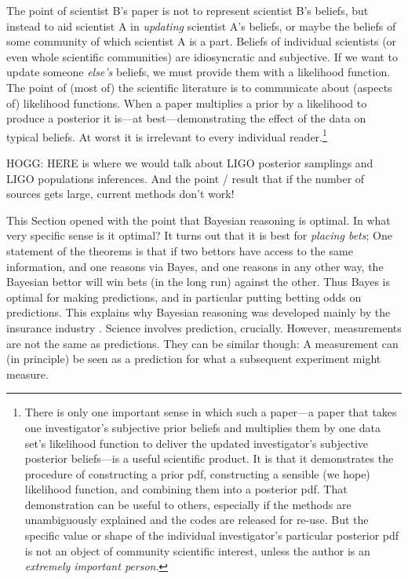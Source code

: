 \documentclass{article}
\newcommand{\sectionname}{Section}
\begin{document}
The point of scientist B's paper is not to represent scientist B's beliefs, but instead to aid scientist A in \emph{updating} scientist A's beliefs, or maybe the beliefs of some community of which scientist A is a part.
Beliefs of individual scientists (or even whole scientific communities) are idiosyncratic and subjective.
If we want to update someone \emph{else's} beliefs, we must provide them with a likelihood function.
The point of (most of) the scientific literature is to communicate about (aspects of) likelihood functions.
When a paper multiplies a prior by a likelihood to produce a posterior it is---at best---demonstrating the effect of the data on typical beliefs.
At worst it is irrelevant to every individual reader.\footnote{%
There is only one important sense in which such a paper---a paper that takes one investigator's subjective prior beliefs and multiplies them by one data set's likelihood function to deliver the updated investigator's subjective posterior beliefs---is a useful scientific product.
It is that it demonstrates the procedure of constructing a prior pdf, constructing a sensible (we hope) likelihood function, and combining them into a posterior pdf.
That demonstration can be useful to others, especially if the methods are unambiguously explained and the codes are released for re-use.
But the specific value or shape of the individual investigator's particular posterior pdf is not an object of community scientific interest, unless the author is an \emph{extremely important person}.}

HOGG: HERE is where we would talk about LIGO posterior samplings and LIGO populations inferences.
And the point / result that if the number of sources gets large, current methods don't work!

This \sectionname{} opened with the point that Bayesian reasoning is optimal.
In what very specific sense is it optimal?
It turns out that it is best for \emph{placing bets};
One statement of the theorems is that if two bettors have access to the same information, and one reasons via Bayes, and one reasons in any other way, the Bayesian bettor will win bets (in the long run) against the other.
Thus Bayes is optimal for making predictions, and in particular putting betting odds on predictions.
This explains why Bayesian reasoning was developed mainly by the insurance industry \cite{bayesactuary}.
Science involves prediction, crucially.
However, measurements are not the same as predictions.
They can be similar though: A measurement can (in principle) be seen as a prediction for what a subsequent experiment might measure.
\end{document}
